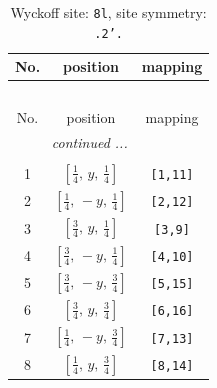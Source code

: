 \documentclass[fleqn,8pt]{jsarticle}
\begin{document}
\begin{longtable}{ccc}
\caption{Wyckoff site: {\tt 8l}, site symmetry: {\tt .2'.}}
 \\
 \hline \hline
No. & position & mapping \\ \hline \endfirsthead

\multicolumn{2}{l}{\tablename\ \thetable{}} \\
 \hline \hline
No. & position & mapping \\ \hline \endhead

 \hline \hline
\multicolumn{2}{r}{\footnotesize\it continued ...} \\ \endfoot

 \hline \hline
\multicolumn{2}{r}{} \\ \endlastfoot

1 & $\left[ \frac{1}{4},\, y,\, \frac{1}{4} \right]$ & {\tt [1,11]} \\ \hline
2 & $\left[ \frac{1}{4},\, - y,\, \frac{1}{4} \right]$ & {\tt [2,12]} \\ \hline
3 & $\left[ \frac{3}{4},\, y,\, \frac{1}{4} \right]$ & {\tt [3,9]} \\ \hline
4 & $\left[ \frac{3}{4},\, - y,\, \frac{1}{4} \right]$ & {\tt [4,10]} \\ \hline
5 & $\left[ \frac{3}{4},\, - y,\, \frac{3}{4} \right]$ & {\tt [5,15]} \\ \hline
6 & $\left[ \frac{3}{4},\, y,\, \frac{3}{4} \right]$ & {\tt [6,16]} \\ \hline
7 & $\left[ \frac{1}{4},\, - y,\, \frac{3}{4} \right]$ & {\tt [7,13]} \\ \hline
8 & $\left[ \frac{1}{4},\, y,\, \frac{3}{4} \right]$ & {\tt [8,14]} \\
\end{longtable}
\renewcommand{\arraystretch}{1.2}
\end{document}
